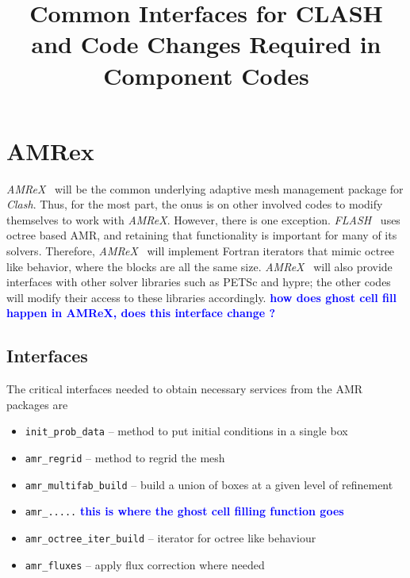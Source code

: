 \documentclass{article}
\title{Common Interfaces for CLASH and Code Changes Required in
Component Codes}
\newcommand{\code}[1]{{\tt#1}}
\newcommand{\mynote}[1]{\textcolor{blue}{{\bf#1}}}
\newcommand{\flash}{{\it FLASH}}
\newcommand{\amrex}{{\it AMReX}}
\newcommand{\clash}{{\it Clash}}
\begin{document}
\maketitle

\section{AMRex}
\label{sec:amrex}
\amrex~ will be the common underlying adaptive mesh management package
for \clash. Thus, for the most part, the onus is on other involved
codes to modify themselves to work with \amrex. However, there is one
exception. \flash~ uses octree based AMR, and retaining that
functionality is important for many of its solvers. Therefore, \amrex~
will implement Fortran iterators that mimic octree like behavior,
where the blocks are all the same size. \amrex~ will also provide
interfaces with other solver libraries such as PETSc and hypre; the
other codes will modify their access to these libraries accordingly.
\mynote{how does ghost cell fill happen in AMReX, does this interface
  change ?}
\subsection{Interfaces}
\label{sec:amrex-interfaces}
The critical interfaces needed to obtain necessary services from the
AMR packages are
\begin{itemize}
\item \code{init\_prob\_data} -- method to put initial conditions in a
single box
\item \code{amr\_regrid} -- method to regrid the mesh
\item \code{amr\_multifab\_build} -- build a union of boxes at a given level
of refinement
\item \code{amr\_.....} \mynote{this is where the ghost cell filling
  function goes}
\item \code{amr\_octree\_iter\_build} -- iterator for octree like behaviour
\item \code{amr\_fluxes} -- apply flux correction where needed
\end{itemize}
\end{document}
